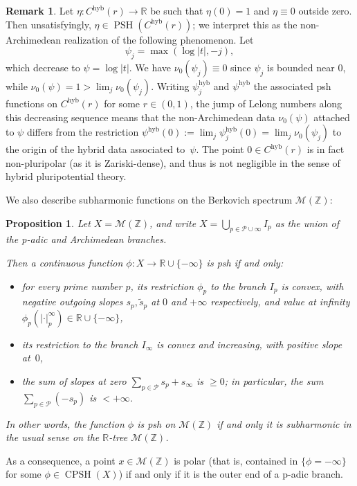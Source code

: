 \documentclass[JEP,XML,SOM,Unicode,published]{cedram}
\newtheorem{prop}[equation]{Proposition}
\theoremstyle{definition}
\newtheorem{rem}[equation]{Remark}
\newcommand \R{\mathbb R}
\newcommand \Z{\mathbb Z}
\newcommand \M {\mathscr {M}}
\DeclareMathOperator{\CPSH}{CPSH}
\newcommand{\hyb}{\mathrm{hyb}}
\DeclareMathOperator{\PSH}{PSH}
\begin{document}
\begin{rem}
Let $\eta: C^{\hyb}(r) \to \R$ be such that $\eta(0) = 1$ and $\eta \equiv 0$ outside zero. Then unsatisfyingly, $\eta \in \PSH(C^{\hyb}(r))$; we interpret this as the non-Archimedean realization of the following phenomenon. Let
\[
\psi_j = \max (\log \lvert t \rvert, -j),
\]
which decrease to $\psi = \log \lvert t \rvert$. We have $\nu_0(\psi_j) \equiv 0$ since $\psi_j$ is bounded near $0$, while $\nu_0(\psi) = 1 > \lim_j \nu_0(\psi_j)$. Writing $\psi_j^{\hyb}$ and $\psi^{\hyb}$ the associated psh functions on $C^{\hyb}(r)$ for some $r \in (0,1)$, the jump of Lelong numbers along this decreasing sequence means that the non-Archimedean data $\nu_0(\psi)$ attached to $\psi$ differs from the restriction $\psi^{\hyb}(0):= \lim_j \psi_j^{\hyb}(0) = \lim_j \nu_0(\psi_j)$ to the origin of the hybrid data associated to~$\psi$. The point $0 \in C^{\hyb}(r)$ is in fact non-pluripolar (as it is Zariski-dense), and thus is not negligible in the sense of hybrid pluripotential theory.
\end{rem}
We also describe subharmonic functions on the Berkovich spectrum $\M(\Z)$:
\begin{prop}
Let $X= \M(\Z)$, and write $X = \bigcup_{p \in \mathcal{P} \cup \infty} I_p$ as the union of the p-adic and Archimedean branches.

Then a continuous function $\phi: X \to \R \cup \{ - \infty \}$ is psh if and only:
\begin{itemize}
\item for every prime number $p$, its restriction $\phi_p$ to the branch $I_p$ is convex, with negative outgoing slopes $s_p, \tilde{s}_p$ at $0$ and $+ \infty$ respectively, and value at infinity $\phi_p(\lvert \cdot \rvert_p^{\infty}) \in \R \cup \{-\infty\}$,
\item its restriction to the branch $I_{\infty}$ is convex and increasing, with positive slope at~$0$,
\item the sum of slopes at zero $\sum_{p \in \mathcal{P}} s_p + s_{\infty}$ is $\ge 0$; in particular, the sum $\sum_{p \in \mathcal{P}} (-s_p)$ is $< + \infty$.
\end{itemize}
In other words, the function $\phi$ is psh on $\M(\Z)$ if and only it is subharmonic in the usual sense on the $\R$-tree $\M(\Z)$.
\end{prop}
As a consequence, a point $x \in \M(\Z)$ is polar (that is, contained in $\{ \phi = -\infty \}$ for some $\phi \in \CPSH(X)$) if and only if it is the outer end of a p-adic branch.
\end{document}

